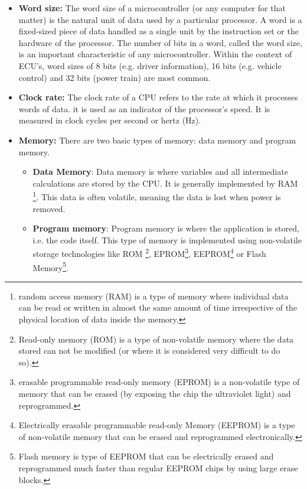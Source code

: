\documentclass[11pt]{article}
\begin{document}
\begin{itemize}
	\item \textbf{Word size:} The word size of a microcontroller (or any computer for that matter) is the natural unit of data used by a particular processor. A word is a fixed-sized piece of data handled as a single unit by the instruction set or the hardware of the processor. The number of bits in a word, called the word size, is an important characteristic of any microcontroller. Within the context of ECU's, word sizes of 8 bits (e.g. driver information), 16 bits (e.g. vehicle control) and 32 bits (power train) are most common.\cite{ECU}
	
	\item \textbf{Clock rate:} The clock rate of a CPU refers to the rate at which it processes words of data. it is used as an indicator of the processor's speed. It is measured in clock cycles per second or hertz (Hz). 
	
	\item \textbf{Memory:} There are two basic types of memory: data memory and program memory.
	\begin{itemize}
		\item \textbf{Data Memory}: Data memory is where variables and all intermediate calculations are stored by the CPU. It is generally implemented by RAM \footnote{random access memory (RAM) is a type of memory where individual data can be read or written in almost the same amount of time irrespective of the physical location of data inside the memory.}. This data is often volatile, meaning the data is lost when power is removed.
		
		\item \textbf{Program memory}: Program memory is where the application is stored, i.e. the code itself. This type of memory is implemented using non-volatile storage technologies like ROM \footnote{Read-only memory (ROM) is a type of non-volatile memory where the data stored can not be modified (or where it is considered very difficult to do so).}, EPROM\footnote{erasable programmable read-only memory (EPROM) is a non-volatile type of memory that can be erased (by exposing the chip the ultraviolet light) and reprogrammed.}, EEPROM\footnote{Electrically erasable programmable read-only Memory (EEPROM) is a type of non-volatile memory that can be erased and reprogrammed electronically.} or Flash Memory\footnote{Flash memory is type of EEPROM  that can be electrically erased and reprogrammed much faster than regular EEPROM chips by using large erase blocks.}.
	\end{itemize}
	

\end{itemize}
\end{document}
